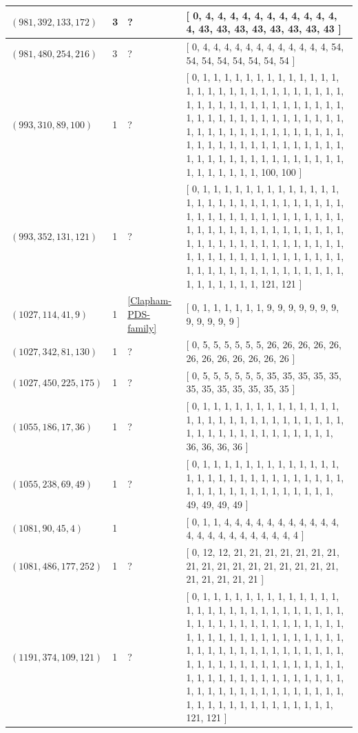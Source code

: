 \documentclass[12pt]{amsproc} %
\theoremstyle{definition}\newtheorem{defn}[thm]{Definition}
\theoremstyle{definition}\newtheorem{rem}[thm]{Remark}
\theoremstyle{definition}\newtheorem{ex}[thm]{Example}
\begin{document}
\begin{center}
\begin{longtable}{p{3.66cm}|P{0.8cm}|P{0.69cm}|p{10cm}}
		\hline
		 $(981, 392, 133, 172)$  & 3 & ? & [ 0, 4, 4, 4, 4, 4, 4, 4, 4, 4, 4, 4, 4, 43, 43, 43, 43, 43, 43, 43, 43 ] \\
		\hline
		 $(981, 480, 254, 216)$  & 3 & ? & [ 0, 4, 4, 4, 4, 4, 4, 4, 4, 4, 4, 4, 4, 54, 54, 54, 54, 54, 54, 54, 54 ] \\
		\hline
		 $(993, 310, 89, 100)$  & 1 & ? & [ 0, 1, 1, 1, 1, 1, 1, 1, 1, 1, 1, 1, 1, 1, 1, 1, 1, 1, 1, 1, 1, 1, 1, 1, 1, 1, 1, 1, 1, 1, 1, 1, 1, 1, 1, 1, 1, 1, 1, 1, 1, 1, 1, 1, 1, 1, 1, 1, 1, 1, 1, 1, 1, 1, 1, 1, 1, 1, 1, 1, 1, 1, 1, 1, 1, 1, 1, 1, 1, 1, 1, 1, 1, 1, 1, 1, 1, 1, 1, 1, 1, 1, 1, 1, 1, 1, 1, 1, 1, 1, 1, 1, 1, 1, 1, 1, 1, 1, 1, 1, 1, 1, 1, 1, 1, 1, 1, 1, 1, 1, 1, 100, 100 ] \\
		\hline
		 $(993, 352, 131, 121)$  & 1 & ? & [ 0, 1, 1, 1, 1, 1, 1, 1, 1, 1, 1, 1, 1, 1, 1, 1, 1, 1, 1, 1, 1, 1, 1, 1, 1, 1, 1, 1, 1, 1, 1, 1, 1, 1, 1, 1, 1, 1, 1, 1, 1, 1, 1, 1, 1, 1, 1, 1, 1, 1, 1, 1, 1, 1, 1, 1, 1, 1, 1, 1, 1, 1, 1, 1, 1, 1, 1, 1, 1, 1, 1, 1, 1, 1, 1, 1, 1, 1, 1, 1, 1, 1, 1, 1, 1, 1, 1, 1, 1, 1, 1, 1, 1, 1, 1, 1, 1, 1, 1, 1, 1, 1, 1, 1, 1, 1, 1, 1, 1, 1, 1, 121, 121 ] \\
		\hline
		 $(1027, 114, 41, 9)$  & 1 & \ref{Clapham-PDS-family} & [ 0, 1, 1, 1, 1, 1, 1, 9, 9, 9, 9, 9, 9, 9, 9, 9, 9, 9, 9 ] \\
		\hline
		 $(1027, 342, 81, 130)$  & 1 & ? & [ 0, 5, 5, 5, 5, 5, 5, 26, 26, 26, 26, 26, 26, 26, 26, 26, 26, 26, 26 ] \\
		\hline
		 $(1027, 450, 225, 175)$  & 1 & ? & [ 0, 5, 5, 5, 5, 5, 5, 35, 35, 35, 35, 35, 35, 35, 35, 35, 35, 35, 35 ] \\
		\hline
		 $(1055, 186, 17, 36)$  & 1 & ? & [ 0, 1, 1, 1, 1, 1, 1, 1, 1, 1, 1, 1, 1, 1, 1, 1, 1, 1, 1, 1, 1, 1, 1, 1, 1, 1, 1, 1, 1, 1, 1, 1, 1, 1, 1, 1, 1, 1, 1, 1, 1, 1, 1, 36, 36, 36, 36 ] \\
		\hline
		 $(1055, 238, 69, 49)$  & 1 & ? & [ 0, 1, 1, 1, 1, 1, 1, 1, 1, 1, 1, 1, 1, 1, 1, 1, 1, 1, 1, 1, 1, 1, 1, 1, 1, 1, 1, 1, 1, 1, 1, 1, 1, 1, 1, 1, 1, 1, 1, 1, 1, 1, 1, 49, 49, 49, 49 ] \\
		\hline
		 $(1081, 90, 45, 4)$  & 1 & \cite{pol-dav-smi-swa} & [ 0, 1, 1, 4, 4, 4, 4, 4, 4, 4, 4, 4, 4, 4, 4, 4, 4, 4, 4, 4, 4, 4, 4, 4, 4 ] \\
		\hline
		 $(1081, 486, 177, 252)$  & 1 & ? & [ 0, 12, 12, 21, 21, 21, 21, 21, 21, 21, 21, 21, 21, 21, 21, 21, 21, 21, 21, 21, 21, 21, 21, 21, 21 ] \\
		\hline
		 $(1191, 374, 109, 121)$  & 1 & ? & [ 0, 1, 1, 1, 1, 1, 1, 1, 1, 1, 1, 1, 1, 1, 1, 1, 1, 1, 1, 1, 1, 1, 1, 1, 1, 1, 1, 1, 1, 1, 1, 1, 1, 1, 1, 1, 1, 1, 1, 1, 1, 1, 1, 1, 1, 1, 1, 1, 1, 1, 1, 1, 1, 1, 1, 1, 1, 1, 1, 1, 1, 1, 1, 1, 1, 1, 1, 1, 1, 1, 1, 1, 1, 1, 1, 1, 1, 1, 1, 1, 1, 1, 1, 1, 1, 1, 1, 1, 1, 1, 1, 1, 1, 1, 1, 1, 1, 1, 1, 1, 1, 1, 1, 1, 1, 1, 1, 1, 1, 1, 1, 1, 1, 1, 1, 1, 1, 1, 1, 1, 1, 1, 1, 1, 1, 1, 1, 1, 1, 1, 1, 1, 1, 121, 121 ] \\

\end{longtable}
\end{center}
\end{document}
